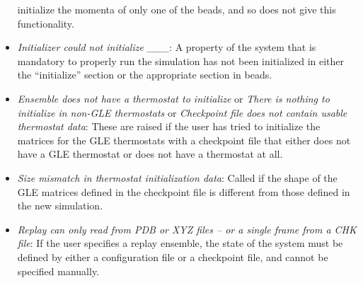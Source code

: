 \documentclass[11pt,english,fleqn]{report}
\begin{document}
\begin{itemize}
initialize the momenta of only one of the beads, and so \ipi does
not give this functionality.
\item \emph{Initializer could not initialize \_\_\_}: A property of the
system that is mandatory to properly run the simulation has not been
initialized in either the {}``initialize'' section or the appropriate
section in beads.
\item \emph{Ensemble does not have a thermostat to initialize} or \emph{There is nothing to initialize in non-GLE thermostats} or \emph{Checkpoint file does not contain usable thermostat data}:
These are raised if the user has tried to initialize the matrices
for the GLE thermostats with a checkpoint file that either does not
have a GLE thermostat or does not have a thermostat at all.
\item \emph{Size mismatch in thermostat initialization data}: Called if
the shape of the GLE matrices defined in the checkpoint file is different
from those defined in the new simulation.
\item \emph{Replay can only read from PDB or XYZ files -- or a single frame from a CHK file}:
If the user specifies a replay ensemble, the state of the system must
be defined by either a configuration file or a checkpoint file, and
cannot be specified manually.
\end{itemize}
\end{document}
